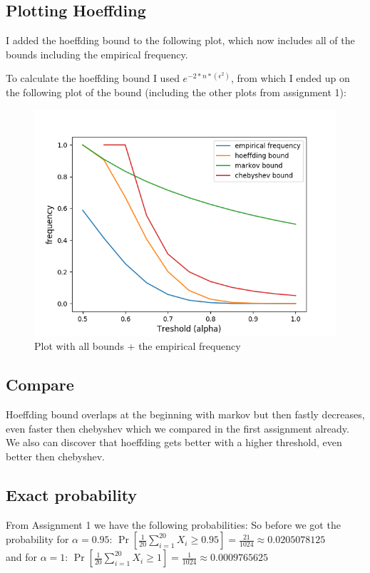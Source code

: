 \subsection{Plotting Hoeffding}

I added the hoeffding bound to the following plot, which now includes all of the bounds including the empirical frequency.

To calculate the hoeffding bound I used $e^{-2 * n * (\epsilon^2)}$, from which I ended up on the following plot of the bound (including the other plots from assignment 1):

\begin{figure}[hbt!]
	\includegraphics[width=\textwidth]{code/ex1}
	\caption{Plot with all bounds + the empirical frequency}
\end{figure}

\subsection{Compare}
Hoeffding bound overlaps at the beginning with markov but then fastly decreases, even faster then chebyshev which we compared in the first assignment already.
We also can discover that hoeffding gets better with a higher threshold, even better then chebyshev.

\subsection{Exact probability}
From Assignment 1 we have the following probabilities:
So before we got the probability for $\alpha = 0.95$: $\Pr\left[\frac 1 {20} \sum_{i=1}^{20} X_i \geq 0.95 \right] = \frac{21}{1024} \approx 0.0205078125$\\
and for $\alpha = 1$: $\Pr\left[\frac 1 {20} \sum_{i=1}^{20} X_i \geq 1 \right] = \frac 1 {1024} \approx 0.0009765625$

